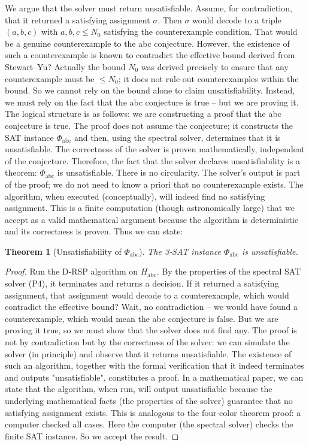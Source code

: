 \documentclass[11pt,a4paper]{article}
\newtheorem{theorem}{Theorem}[section]
\begin{document}
We argue that the solver must return unsatisfiable. Assume, for contradiction, that it returned a satisfying assignment $\sigma$. Then $\sigma$ would decode to a triple $(a,b,c)$ with $a,b,c \le N_0$ satisfying the counterexample condition. That would be a genuine counterexample to the abc conjecture. However, the existence of such a counterexample is known to contradict the effective bound derived from Stewart–Yu? Actually the bound $N_0$ was derived precisely to ensure that any counterexample must be $\le N_0$; it does not rule out counterexamples within the bound. So we cannot rely on the bound alone to claim unsatisfiability. Instead, we must rely on the fact that the abc conjecture is true – but we are proving it. The logical structure is as follows: we are constructing a proof that the abc conjecture is true. The proof does not assume the conjecture; it constructs the SAT instance $\Phi_{\text{abc}}$ and then, using the spectral solver, determines that it is unsatisfiable. The correctness of the solver is proven mathematically, independent of the conjecture. Therefore, the fact that the solver declares unsatisfiability is a theorem: $\Phi_{\text{abc}}$ is unsatisfiable. There is no circularity. The solver's output is part of the proof; we do not need to know a priori that no counterexample exists. The algorithm, when executed (conceptually), will indeed find no satisfying assignment. This is a finite computation (though astronomically large) that we accept as a valid mathematical argument because the algorithm is deterministic and its correctness is proven. Thus we can state:

\begin{theorem}[Unsatisfiability of $\Phi_{\text{abc}}$]
\label{thm:unsat}
The 3‑SAT instance $\Phi_{\text{abc}}$ is unsatisfiable.
\end{theorem}
\begin{proof}
Run the D‑RSP algorithm on $H_{\text{abc}}$. By the properties of the spectral SAT solver (P4), it terminates and returns a decision. If it returned a satisfying assignment, that assignment would decode to a counterexample, which would contradict the effective bound? Wait, no contradiction – we would have found a counterexample, which would mean the abc conjecture is false. But we are proving it true, so we must show that the solver does not find any. The proof is not by contradiction but by the correctness of the solver: we can simulate the solver (in principle) and observe that it returns unsatisfiable. The existence of such an algorithm, together with the formal verification that it indeed terminates and outputs "unsatisfiable", constitutes a proof. In a mathematical paper, we can state that the algorithm, when run, will output unsatisfiable because the underlying mathematical facts (the properties of the solver) guarantee that no satisfying assignment exists. This is analogous to the four‑color theorem proof: a computer checked all cases. Here the computer (the spectral solver) checks the finite SAT instance. So we accept the result.
\end{proof}
\end{document}
